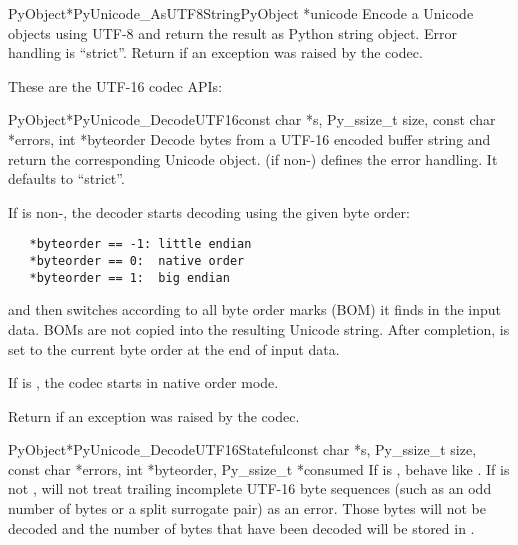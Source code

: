 \begin{cfuncdesc}{PyObject*}{PyUnicode_AsUTF8String}{PyObject *unicode}
  Encode a Unicode objects using UTF-8 and return the result as
  Python string object.  Error handling is ``strict''.  Return
  \NULL{} if an exception was raised by the codec.
\end{cfuncdesc}


These are the UTF-16 codec APIs:

\begin{cfuncdesc}{PyObject*}{PyUnicode_DecodeUTF16}{const char *s,
                                               Py_ssize_t size,
                                               const char *errors,
                                               int *byteorder}
  Decode  bytes from a UTF-16 encoded buffer string and
  return the corresponding Unicode object.   (if
  non-\NULL{}) defines the error handling. It defaults to ``strict''.

  If  is non-\NULL{}, the decoder starts decoding using
  the given byte order:

\begin{verbatim}
   *byteorder == -1: little endian
   *byteorder == 0:  native order
   *byteorder == 1:  big endian
\end{verbatim}

  and then switches according to all byte order marks (BOM) it finds
  in the input data.  BOMs are not copied into the resulting Unicode
  string.  After completion,  is set to the current
  byte order at the end of input data.

  If  is \NULL{}, the codec starts in native order mode.

  Return \NULL{} if an exception was raised by the codec.
\end{cfuncdesc}

\begin{cfuncdesc}{PyObject*}{PyUnicode_DecodeUTF16Stateful}{const char *s,
                                               Py_ssize_t size,
                                               const char *errors,
                                               int *byteorder,
                                               Py_ssize_t *consumed}
  If  is \NULL{}, behave like
  . If  is not \NULL{},
   will not treat trailing incomplete
  UTF-16 byte sequences (such as an odd number of bytes or a split surrogate pair)
  as an error. Those bytes will not be decoded and the number of bytes that
  have been decoded will be stored in .
\end{cfuncdesc}

